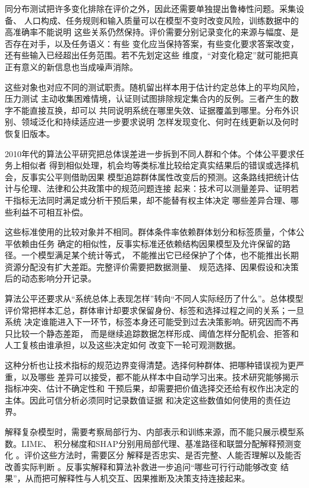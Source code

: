 同分布测试把许多变化排除在评价之外，因此还需要单独提出鲁棒性问题。采集设备、
人口构成、任务规则和输入质量可以在模型不变时改变风险，训练数据中的高准确率不能说明
这些关系仍然保持。评价需要分别记录变化的来源与幅度、是否存在对手，以及任务语义：有些
变化应当保持答案，有些变化要求答案改变，还有些输入已经超出任务范围。若不先划定这些
维度，“对变化稳定”就可能把真正有意义的新信息也当成噪声消除。

这些对象也对应不同的测试职责。随机留出样本用于估计约定总体上的平均风险，压力测试
主动收集困难情境，认证则试图排除规定集合内的反例。三者产生的数字不能直接互换，却可以
共同说明系统在哪里失效、证据覆盖到哪里。分布外识别、领域泛化和持续适应进一步要求说明
怎样发现变化、何时在线更新以及何时恢复旧版本。

2010年代的算法公平研究把总体误差进一步拆到不同人群和个体。个体公平要求任务上相似者
得到相似处理，机会均等类标准比较给定真实结果后的错误或选择机会，反事实公平则借助因果
模型追踪群体属性改变后的预测。这条路线把统计估计与伦理、法律和公共政策中的规范问题连接
起来：技术可以测量差异、证明若干指标无法同时满足或分析干预后果，却不能替有权主体决定
哪些差异合理、哪些利益不可相互补偿。

这些标准使用的比较对象并不相同。群体条件率依赖群体划分和标签质量，个体公平依赖由任务
确定的相似性，反事实标准还依赖结构因果模型及允许保留的路径。一个模型满足某个统计等式，
不能推出它已经保护了个体，也不能推出长期资源分配没有扩大差距。完整评价需要把数据测量、
规范选择、因果假设和决策后的动态影响分开记录。

算法公平还要求从“系统总体上表现怎样”转向“不同人实际经历了什么”。总体模型
评价常把样本汇总，群体审计却要求保留身份、标签和选择过程之间的关系；一旦系统
决定谁能进入下一环节，标签本身还可能受到过去决策影响。研究因而不再只比较一个静态差距，
而是继续追踪数据怎样形成、阈值怎样分配机会、拒答和人工复核由谁承担，以及这些决定如何
改变下一轮可观测数据。

这种分析也让技术指标的规范边界变得清楚。选择何种群体、把哪种错误视为更严重，以及哪些
差异可以接受，都不能从样本中自动学习出来。技术研究能够揭示指标冲突、估计不确定性和
干预后果，却需要把价值选择交还给有权作出决定的主体。因此可信分析必须同时记录数值证据
和决定这些数值如何使用的责任边界。

解释复杂模型时，需要考察局部行为、内部表示和训练来源，而不能只展示模型系数。LIME、
积分梯度和SHAP分别用局部代理、基准路径和联盟分配解释预测变化
。评价这些方法时，需要区分
解释是否忠实、是否完整、人能否理解以及能否改善实际判断
。反事实解释和算法补救进一步追问“哪些可行行动能够改变
结果”，从而把可解释性与人机交互、因果推断及决策支持连接起来。

